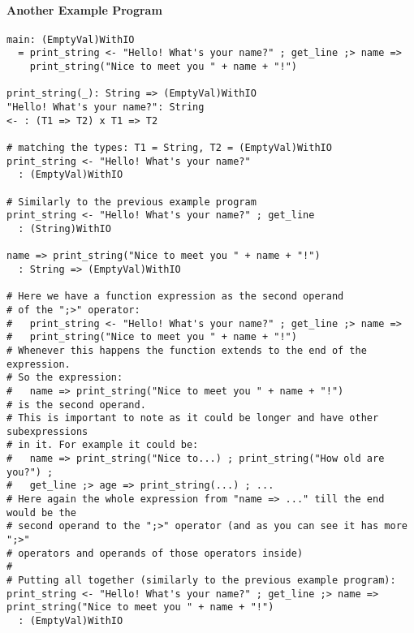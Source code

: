 \documentclass{article}
\begin{document}
\newpage
\paragraph{Another Example Program}
\begin{verbatim}
main: (EmptyVal)WithIO
  = print_string <- "Hello! What's your name?" ; get_line ;> name =>
    print_string("Nice to meet you " + name + "!")

print_string(_): String => (EmptyVal)WithIO
"Hello! What's your name?": String
<- : (T1 => T2) x T1 => T2

# matching the types: T1 = String, T2 = (EmptyVal)WithIO
print_string <- "Hello! What's your name?"
  : (EmptyVal)WithIO

# Similarly to the previous example program
print_string <- "Hello! What's your name?" ; get_line
  : (String)WithIO

name => print_string("Nice to meet you " + name + "!")
  : String => (EmptyVal)WithIO

# Here we have a function expression as the second operand
# of the ";>" operator:
#   print_string <- "Hello! What's your name?" ; get_line ;> name =>
#   print_string("Nice to meet you " + name + "!")
# Whenever this happens the function extends to the end of the expression.
# So the expression:
#   name => print_string("Nice to meet you " + name + "!")
# is the second operand.
# This is important to note as it could be longer and have other subexpressions
# in it. For example it could be:
#   name => print_string("Nice to...) ; print_string("How old are you?") ;
#   get_line ;> age => print_string(...) ; ...
# Here again the whole expression from "name => ..." till the end would be the
# second operand to the ";>" operator (and as you can see it has more ";>"
# operators and operands of those operators inside)
#
# Putting all together (similarly to the previous example program):
print_string <- "Hello! What's your name?" ; get_line ;> name =>
print_string("Nice to meet you " + name + "!")
  : (EmptyVal)WithIO
\end{verbatim}
\end{document}
